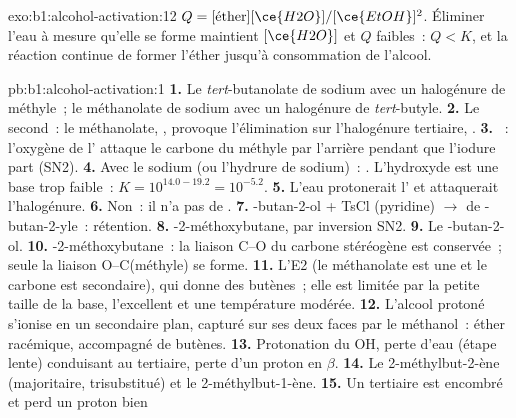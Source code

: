 \begin{solution}{exo:b1:alcohol-activation:12}
$Q = [\text{éther}][\ce{H2O}]/[\ce{EtOH}]^2$. Éliminer l'eau à mesure
qu'elle se forme maintient $[\ce{H2O}]$ et $Q$ faibles~: $Q < K$, et la
réaction continue de former l'éther jusqu'à consommation de l'alcool.
\end{solution}

\begin{solution}{pb:b1:alcohol-activation:1}
\textbf{1.} Le \textit{tert}-butanolate de sodium avec un halogénure de
méthyle~; le méthanolate de sodium avec un halogénure de
\textit{tert}-butyle.
\textbf{2.} Le second~: le méthanolate, , provoque
l'élimination sur l'halogénure tertiaire,
.
\textbf{3.} ~: l'oxygène de
l' attaque le carbone du méthyle par l'arrière pendant que
l'iodure part (SN2).
\textbf{4.} Avec le sodium (ou l'hydrure de sodium)~: . L'hydroxyde est une base trop faible~: $K = 10^{14.0 -
19.2} = 10^{-5.2}$.
\textbf{5.} L'eau protonerait l' et attaquerait l'halogénure.
\textbf{6.} Non~: il n'a pas de .
\textbf{7.} -butan-2-ol + TsCl (pyridine) $\to$  de
-butan-2-yle~: rétention.
\textbf{8.} -2-méthoxybutane, par inversion SN2.
\textbf{9.} Le -butan-2-ol.
\textbf{10.} -2-méthoxybutane~: la liaison C--O du carbone
stéréogène est conservée~; seule la liaison O--C(méthyle) se forme.
\textbf{11.} L'E2 (le méthanolate est une  et le carbone est
secondaire), qui donne des butènes~; elle est limitée par la petite
taille de la base, l'excellent  et une température modérée.
\textbf{12.} L'alcool protoné s'ionise en un  secondaire plan,
capturé sur ses deux faces par le méthanol~: éther racémique, accompagné
de butènes.
\textbf{13.} Protonation du OH, perte d'eau (étape lente) conduisant au
 tertiaire, perte d'un proton en $\beta$.
\textbf{14.} Le 2-méthylbut-2-ène (majoritaire, trisubstitué) et le
2-méthylbut-1-ène.
\textbf{15.} Un  tertiaire est encombré et perd un proton bien

\end{solution}
